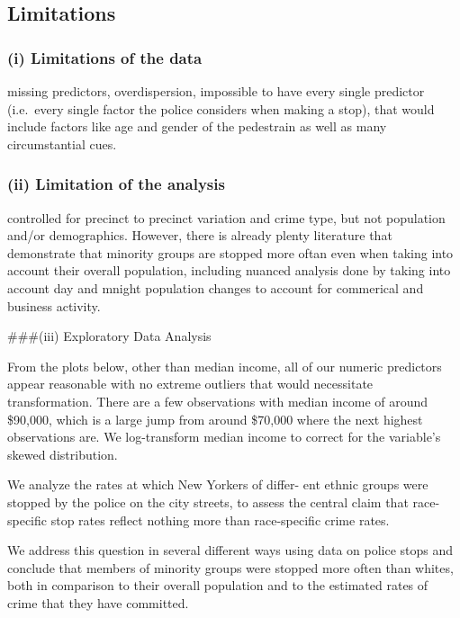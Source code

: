 \documentclass[]{article}
\begin{document}
\hypertarget{limitations}{%
\subsection{Limitations}\label{limitations}}

\hypertarget{i-limitations-of-the-data}{%
\subsubsection{(i) Limitations of the
data}\label{i-limitations-of-the-data}}

missing predictors, overdispersion, impossible to have every single
predictor (i.e.~every single factor the police considers when making a
stop), that would include factors like age and gender of the pedestrain
as well as many circumstantial cues.

\hypertarget{ii-limitation-of-the-analysis}{%
\subsubsection{(ii) Limitation of the
analysis}\label{ii-limitation-of-the-analysis}}

controlled for precinct to precinct variation and crime type, but not
population and/or demographics. However, there is already plenty
literature that demonstrate that minority groups are stopped more oftan
even when taking into account their overall population, including
nuanced analysis done by taking into account day and mnight population
changes to account for commerical and business activity.

\#\#\#(iii) Exploratory Data Analysis

From the plots below, other than median income, all of our numeric
predictors appear reasonable with no extreme outliers that would
necessitate transformation. There are a few observations with median
income of around \$90,000, which is a large jump from around \$70,000
where the next highest observations are. We log-transform median income
to correct for the variable's skewed distribution.

We analyze the rates at which New Yorkers of differ- ent ethnic groups
were stopped by the police on the city streets, to assess the central
claim that race-specific stop rates reflect nothing more than
race-specific crime rates.

We address this question in several different ways using data on police
stops and conclude that members of minority groups were stopped more
often than whites, both in comparison to their overall population and to
the estimated rates of crime that they have committed.
\end{document}
